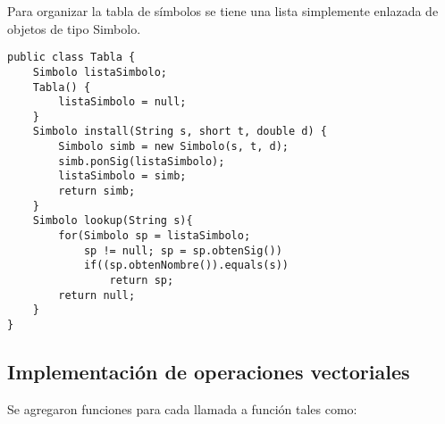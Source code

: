 Para organizar la tabla de símbolos se tiene una lista simplemente
enlazada de objetos de tipo Simbolo.

\begin{lstlisting}
public class Tabla {
	Simbolo listaSimbolo;
	Tabla() {
		listaSimbolo = null;
	}
	Simbolo install(String s, short t, double d) {
		Simbolo simb = new Simbolo(s, t, d);
		simb.ponSig(listaSimbolo);
		listaSimbolo = simb;
		return simb;
	}
	Simbolo lookup(String s){
		for(Simbolo sp = listaSimbolo; 
		    sp != null; sp = sp.obtenSig())
			if((sp.obtenNombre()).equals(s))
				return sp;
		return null;
	}
}
\end{lstlisting}

\subsection{Implementación de operaciones vectoriales}
Se agregaron funciones para cada llamada a función tales como:
